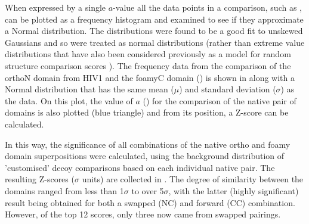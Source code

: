 When expressed by a single $a$-value
all the data points in a comparison, such as ,
can be plotted as a frequency histogram and examined to see if they approximate a Normal
distribution.   The distributions were found to be a good fit to unskewed Gaussians and
so were treated as normal distributions (rather than extreme value distributions
that have also been considered previously as a model for random structure comparison scores
\cite{LevittMet98,TaylorWR06a}).    The frequency data from the comparison of the orthoN domain from
HIV1 and the foamyC domain () is shown in  along with a Normal  
distribution that has the same mean ($\mu$) and standard deviation ($\sigma$) as the data.
On this plot, the value of $a$ () for the comparison of the
native pair of domains is also plotted (blue triangle) and from its position, a Z-score
can be calculated.

In this way, the significance of all combinations of the native ortho and foamy domain
superpositions were calculated, using the background distribution of 'customised' decoy
comparisons based on each individual native pair.   The resulting Z-scores ($\sigma$ units)
are collected in .   The degree of similarity between the domains ranged from
less than 1$\sigma$ to over 5$\sigma$, with the latter (highly significant) result being
obtained for both a swapped (NC) and forward (CC) combination.   However, of the top 12
scores, only three now came from swapped pairings. 

